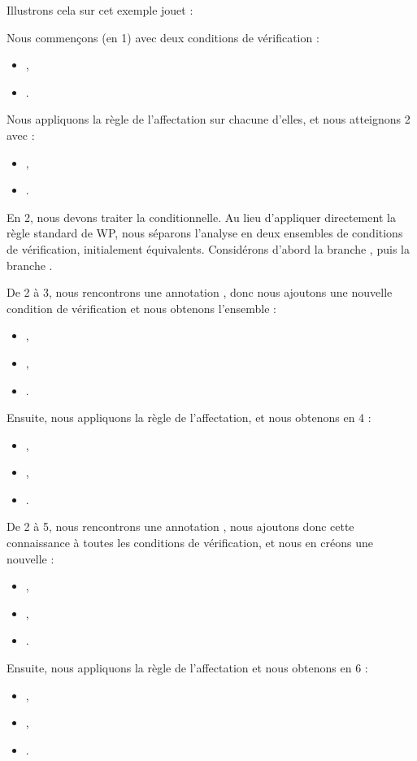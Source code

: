 Illustrons cela sur cet exemple jouet :




Nous commençons (en 1) avec deux conditions de vérification :
\begin{itemize}
  \item {},
  \item {}.
\end{itemize}
Nous appliquons la règle de l'affectation sur chacune d'elles, et nous atteignons
2 avec :
\begin{itemize}
  \item {},
  \item {}.
\end{itemize}
En 2, nous devons traiter la conditionnelle. Au lieu d'appliquer directement
la règle standard de WP, nous séparons l'analyse en deux ensembles de conditions
de vérification, initialement équivalents. Considérons d'abord la branche
, puis la branche .


De 2 à 3, nous rencontrons une annotation , donc nous ajoutons
une nouvelle condition de vérification et nous obtenons l'ensemble :
\begin{itemize}
  \item {},
  \item {},
  \item {}.
\end{itemize}
Ensuite, nous appliquons la règle de l'affectation, et nous obtenons en 4 :
\begin{itemize}
  \item {},
  \item {},
  \item {}.
\end{itemize}


De 2 à 5, nous rencontrons une annotation , nous ajoutons
donc cette connaissance à toutes les conditions de vérification, et nous en
créons une nouvelle :
\begin{itemize}
  \item {},
  \item {},
  \item {}.
\end{itemize}
Ensuite, nous appliquons la règle de l'affectation et nous obtenons en 6 :
\begin{itemize}
  \item {},
  \item {},
  \item {}.
\end{itemize}


